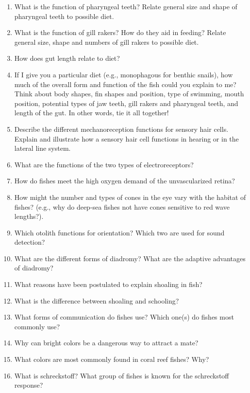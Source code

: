 \documentclass[letterpaper]{tufte-handout}
\begin{document}
\begin{enumerate}
	\item What is the function of pharyngeal teeth?  Relate general size and shape of pharyngeal teeth to possible diet.

	\item What is the function of gill rakers?  How do they aid in feeding?  Relate general size, shape and numbers of gill rakers to possible diet.

	\item How does gut length relate to diet?

	\item If I give you a particular diet (e.g., monophagous for benthic snails), how much of the overall form and function of the fish could you explain to me?  Think about body shapes, fin shapes and position, type of swimming, mouth position, potential types of jaw teeth, gill rakers and pharyngeal teeth, and length of the gut.  In other words, tie it all together!

	\item Describe the different mechanoreception functions for sensory hair cells.  Explain and illustrate how a sensory hair cell functions in hearing or in the lateral line system.

	\item What are the functions of the two types of electroreceptors?

	\item How do fishes meet the high oxygen demand of the unvascularized retina?

	\item How might the number and types of cones in the eye vary with the habitat of fishes? (e.g., why do deep-sea fishes not have cones sensitive to red wave lengths?).

	\item Which otolith functions for orientation?  Which two are used for sound detection?

	\item What are the different forms of diadromy?  What are the adaptive advantages of diadromy?

	\item What reasons have been postulated to explain shoaling in fish?

	\item What is the difference between shoaling and schooling?

	\item What forms of communication do fishes use?  Which one(s) do fishes most commonly use?

	\item Why can bright colors be a dangerous way to attract a mate?

	\item What colors are most commonly found in coral reef fishes?  Why?

	\item What is schreckstoff?  What group of fishes is known for the schreckstoff response?

\end{enumerate}
\end{document}

